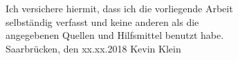 \null\vfill
\begin{center}
Ich versichere hiermit, dass ich die vorliegende Arbeit \\
selbständig verfasst und keine anderen als die \\
angegebenen Quellen und Hilfsmittel benutzt habe.\\


\vspace{4cm}
Saarbrücken, den xx.xx.2018 \hspace{4cm} Kevin Klein\\
\end{center}
\vfill
